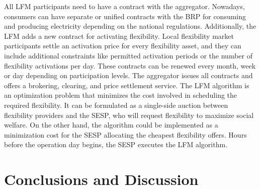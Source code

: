All LFM participants need to have a contract with the aggregator. Nowadays, consumers can have separate or unified contracts with the BRP for consuming and producing electricity depending on the national regulations. Additionally, the LFM adds a new contract for activating flexibility. Local flexibility market participants settle an activation price for every flexibility asset, and they can include additional constraints like permitted activation periods or the number of flexibility activations per day. These contracts can be renewed every month, week or day depending on participation levels. The aggregator issues all contracts and offers a
brokering, clearing, and price settlement service. The LFM algorithm is an optimization problem that minimizes the cost involved in scheduling the required flexibility. It can be formulated as a single-side auction between flexibility providers and the SESP, who will request flexibility to maximize social welfare. On the other hand, the algorithm could be implemented as a minimization cost for the SESP allocating the cheapest flexibility offers. Hours before the operation day begins, the SESP executes the LFM algorithm.

\section{Conclusions and Discussion}

